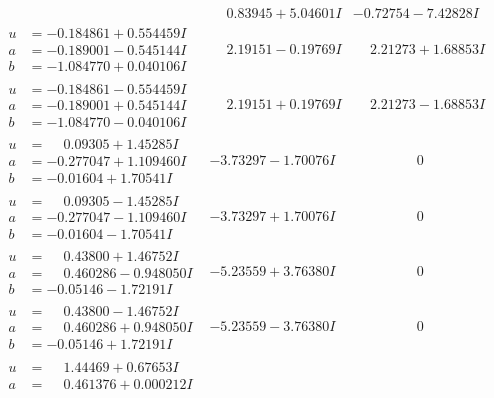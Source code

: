 \documentclass[1p]{elsarticle_modified}
\theoremstyle{definition}
\begin{document}
$$\begin{array}{c|c|c}
 & \phantom{-}0.83945 + 5.04601 I & -0.72754 - 7.42828 I \\ \hline\begin{aligned}
u &= -0.184861 + 0.554459 I \\
a &= -0.189001 - 0.545144 I \\
b &= -1.084770 + 0.040106 I\end{aligned}
 & \phantom{-}2.19151 - 0.19769 I & \phantom{-}2.21273 + 1.68853 I \\ \hline\begin{aligned}
u &= -0.184861 - 0.554459 I \\
a &= -0.189001 + 0.545144 I \\
b &= -1.084770 - 0.040106 I\end{aligned}
 & \phantom{-}2.19151 + 0.19769 I & \phantom{-}2.21273 - 1.68853 I \\ \hline\begin{aligned}
u &= \phantom{-}0.09305 + 1.45285 I \\
a &= -0.277047 + 1.109460 I \\
b &= -0.01604 + 1.70541 I\end{aligned}
 & -3.73297 - 1.70076 I & \phantom{-0.000000 } 0 \\ \hline\begin{aligned}
u &= \phantom{-}0.09305 - 1.45285 I \\
a &= -0.277047 - 1.109460 I \\
b &= -0.01604 - 1.70541 I\end{aligned}
 & -3.73297 + 1.70076 I & \phantom{-0.000000 } 0 \\ \hline\begin{aligned}
u &= \phantom{-}0.43800 + 1.46752 I \\
a &= \phantom{-}0.460286 - 0.948050 I \\
b &= -0.05146 - 1.72191 I\end{aligned}
 & -5.23559 + 3.76380 I & \phantom{-0.000000 } 0 \\ \hline\begin{aligned}
u &= \phantom{-}0.43800 - 1.46752 I \\
a &= \phantom{-}0.460286 + 0.948050 I \\
b &= -0.05146 + 1.72191 I\end{aligned}
 & -5.23559 - 3.76380 I & \phantom{-0.000000 } 0 \\ \hline\begin{aligned}
u &= \phantom{-}1.44469 + 0.67653 I \\
a &= \phantom{-}0.461376 + 0.000212 I \\

\end{aligned}
\end{array}$$
\end{document}

